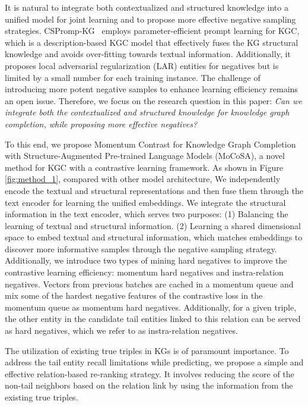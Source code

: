 \documentclass[11pt]{article}
\begin{document}
It is natural to integrate both contextualized and structured knowledge into a unified model for joint learning and to propose more effective negative sampling strategies. CSPromp-KG~\cite{Chen2023DippingPS} employs parameter-efficient
prompt learning for KGC, which is a description-based KGC model that effectively fuses the KG structural knowledge and avoids over-fitting towards textual information. Additionally, it proposes local adversarial regularization (LAR) entities for negatives but is limited by a small number for each training instance. The challenge of introducing more potent negative samples to enhance learning efficiency remains an open issue.
Therefore, we focus on the research question in this paper: \textit{Can we integrate both the contextualized and structured knowledge for knowledge graph completion, while proposing more effective negatives?}



To this end, we propose Momentum Contrast for Knowledge Graph Completion with Structure-Augmented Pre-trained Language Models (MoCoSA), a novel method for KGC with a contrastive learning framework. As shown in Figure \ref{fig:method_1}, compared with other model architecture, We independently encode the textual and structural representations and then fuse them through the text encoder for learning the unified embeddings.
We integrate the structural information in the text encoder, which serves two purposes:
(1) Balancing the learning of textual and structural information. (2) Learning a shared dimensional space to embed textual and structural information, which matches embeddings to discover more informative samples through the negative sampling strategy. Additionally, we introduce two types of mining hard negatives to improve the contrastive learning efficiency: momentum hard negatives and instra-relation negatives. Vectors from previous batches are cached in a momentum queue \cite{he2020momentum} and mix \cite{Kalantidis2020HardNM} some of the
hardest negative features of the contrastive loss in the momentum queue as momentum hard negatives. Additionally, for a given triple, the other entity in the candidate tail entities linked to this relation can be served as hard negatives, which we refer to as instra-relation negatives.

The utilization of existing true triples in KGs is of paramount importance. To address the tail entity recall limitations while predicting, we propose a simple and effective relation-based re-ranking strategy. It involves reducing the score of the non-tail neighbors based on the relation link by using the information from the existing true triples.
\end{document}
